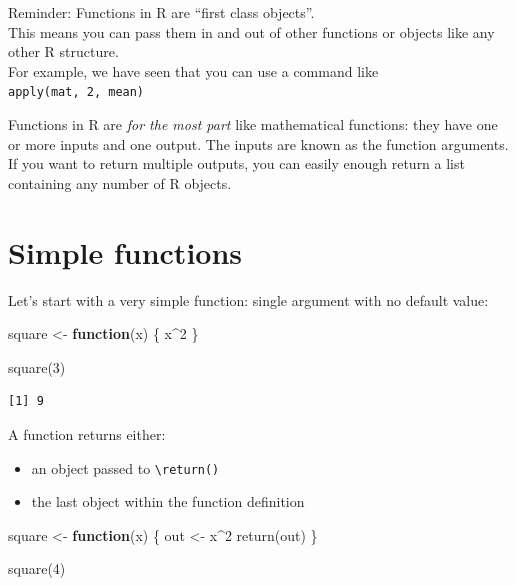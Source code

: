 \documentclass[
]{book}
\newenvironment{Shaded}{\begin{snugshade}}{\end{snugshade}}
\newcommand{\ControlFlowTok}[1]{\textcolor[rgb]{0.13,0.29,0.53}{\textbf{#1}}}
\newcommand{\DecValTok}[1]{\textcolor[rgb]{0.00,0.00,0.81}{#1}}
\newcommand{\FunctionTok}[1]{\textcolor[rgb]{0.00,0.00,0.00}{#1}}
\newcommand{\NormalTok}[1]{#1}
\newcommand{\OtherTok}[1]{\textcolor[rgb]{0.56,0.35,0.01}{#1}}
\newcommand{\SpecialCharTok}[1]{\textcolor[rgb]{0.00,0.00,0.00}{#1}}
\providecommand{\tightlist}{%
  \setlength{\itemsep}{0pt}\setlength{\parskip}{0pt}}
\begin{document}
Reminder: Functions in R are ``first class objects''.\\
This means you can pass them in and out of other functions or objects like any other R structure.\\
For example, we have seen that you can use a command like \texttt{apply(mat,\ 2,\ mean)}

Functions in R are \emph{for the most part} like mathematical functions: they have one or more inputs and one output. The inputs are known as the function arguments. If you want to return multiple outputs, you can easily enough return a list containing any number of R objects.

\hypertarget{simple-functions}{%
\section{Simple functions}\label{simple-functions}}

Let's start with a very simple function: single argument with no default value:

\begin{Shaded}
\begin{Highlighting}[]
\NormalTok{square }\OtherTok{\textless{}{-}} \ControlFlowTok{function}\NormalTok{(x) \{}
\NormalTok{  x}\SpecialCharTok{\^{}}\DecValTok{2}
\NormalTok{\}}

\FunctionTok{square}\NormalTok{(}\DecValTok{3}\NormalTok{)}
\end{Highlighting}
\end{Shaded}

\begin{verbatim}
[1] 9
\end{verbatim}

A function returns either:

\begin{itemize}
\tightlist
\item
  an object passed to \texttt{\textbackslash{}return()}
\item
  the last object within the function definition
\end{itemize}

\begin{Shaded}
\begin{Highlighting}[]
\NormalTok{square }\OtherTok{\textless{}{-}} \ControlFlowTok{function}\NormalTok{(x) \{}
\NormalTok{  out }\OtherTok{\textless{}{-}}\NormalTok{ x}\SpecialCharTok{\^{}}\DecValTok{2}
  \FunctionTok{return}\NormalTok{(out)}
\NormalTok{\}}

\FunctionTok{square}\NormalTok{(}\DecValTok{4}\NormalTok{)}
\end{Highlighting}
\end{Shaded}
\end{document}
